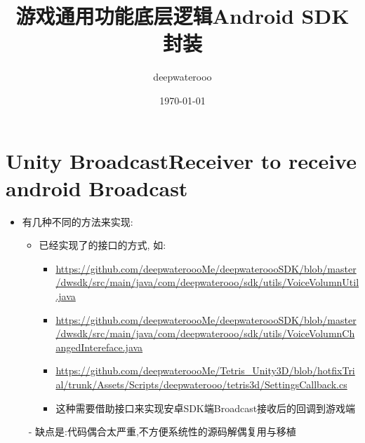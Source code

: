 \documentclass[9pt, b5paper]{article}
\author{deepwaterooo}
\date{\today}
\title{游戏通用功能底层逻辑Android SDK 封装}
\begin{document}
\maketitle
\tableofcontents


\section{Unity BroadcastReceiver to receive android Broadcast}
\label{sec-1}
\begin{itemize}
\item 有几种不同的方法来实现:
\begin{itemize}
\item 已经实现了的接口的方式, 如:
\begin{itemize}
\item \url{https://github.com/deepwateroooMe/deepwateroooSDK/blob/master/dwsdk/src/main/java/com/deepwaterooo/sdk/utils/VoiceVolumnUtil.java}
\item \url{https://github.com/deepwateroooMe/deepwateroooSDK/blob/master/dwsdk/src/main/java/com/deepwaterooo/sdk/utils/VoiceVolumnChangedIntereface.java}
\item \url{https://github.com/deepwateroooMe/Tetris_Unity3D/blob/hotfixTrial/trunk/Assets/Scripts/deepwaterooo/tetris3d/SettingsCallback.cs}
\item 这种需要借助接口来实现安卓SDK端Broadcast接收后的回调到游戏端
\end{itemize}
\end{itemize}
\end{itemize}
　　 - 缺点是:代码偶合太严重,不方便系统性的源码解偶复用与移植
\end{document}
